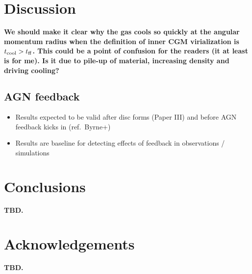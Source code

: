 \documentclass[fleqn,usenatbib]{mnras}
\begin{document}
\section{Discussion}

\textbf{
We should make it clear why the gas cools so quickly at the angular momentum radius when the definition of inner CGM virialization is $t_{\rm cool} > t_{\rm ff}$.
This could be a point of confusion for the readers (it at least is for me).
Is it due to pile-up of material, increasing density and driving cooling?
}

\subsection{AGN feedback}

\begin{itemize}
    \item Results expected to be valid after disc forms (Paper III) and before AGN feedback kicks in (ref.~Byrne+)
    \item Results are baseline for detecting effects of feedback in observations / simulations
    
\end{itemize}

\section{Conclusions}

\textbf{TBD.}

\section*{Acknowledgements}

\textbf{TBD.}








\end{document}
